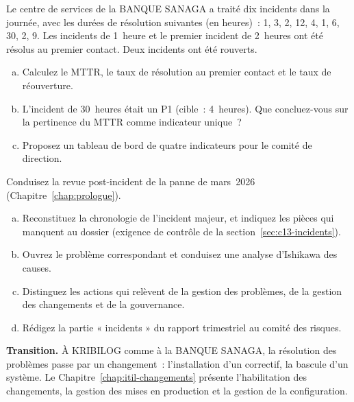 \begin{boxexo}[title={\ding{45}\quad Exercice~13.2. Calculer les indicateurs \niveaumoyen}]
Le centre de services de la BANQUE SANAGA a traité dix incidents dans la
journée, avec les durées de résolution suivantes (en heures)~: 1, 3, 2,
12, 4, 1, 6, 30, 2, 9. Les incidents de 1~heure et le premier incident de
2~heures ont été résolus au premier contact. Deux incidents ont été
rouverts.
\begin{enumerate}[(a)]
    \item Calculez le MTTR, le taux de résolution au premier contact et le
          taux de réouverture.
    \item L'incident de 30~heures était un P1 (cible~: 4~heures). Que
          concluez-vous sur la pertinence du MTTR comme indicateur unique~?
    \item Proposez un tableau de bord de quatre indicateurs pour le comité
          de direction.
\end{enumerate}
\end{boxexo}

\begin{boxexo}[title={\ding{45}\quad Exercice~13.3. La revue post-incident de la BANQUE SANAGA \niveauexpert}]
Conduisez la revue post-incident de la panne de mars~2026
(Chapitre~\ref{chap:prologue}).
\begin{enumerate}[(a)]
    \item Reconstituez la chronologie de l'incident majeur, et indiquez les
          pièces qui manquent au dossier (exigence de contrôle de la
          section~\ref{sec:c13-incidents}).
    \item Ouvrez le problème correspondant et conduisez une analyse
          d'Ishikawa des causes.
    \item Distinguez les actions qui relèvent de la gestion des problèmes,
          de la gestion des changements et de la gouvernance.
    \item Rédigez la partie « incidents » du rapport trimestriel au comité
          des risques.
\end{enumerate}
\end{boxexo}

\bigskip

\begin{boxinfo}
\textbf{Transition.} À KRIBILOG comme à la BANQUE SANAGA, la résolution des
problèmes passe par un changement~: l'installation d'un correctif, la
bascule d'un système. Le Chapitre~\ref{chap:itil-changements} présente
l'habilitation des changements, la gestion des mises en production et la
gestion de la configuration.
\end{boxinfo}
